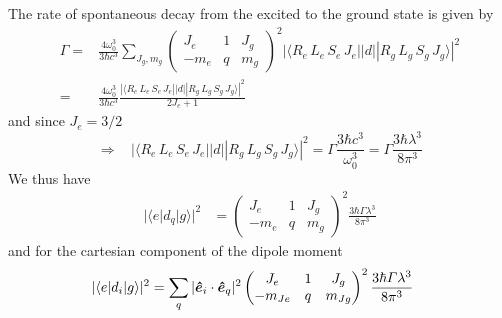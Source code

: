 The rate of spontaneous decay from the excited to the ground state is given by~\cite{budker2004atomic} 
\begin{equation}
\begin{split}
 \Gamma  = & \frac{4\omega_{0}^{3} }{3\hbar c^{3}} \sum_{J_{g}, m_{g} } 
 \begin{pmatrix} J_{e} & 1 & J_{g} \\ -m_{e} & q & m_{g} \end{pmatrix}^{2}
  |\langle R_{e}\, L_{e}\,S_{e}\,J_{e} || d || 
           R_{g}\, L_{g}\,S_{g}\,J_{g} \rangle|^{2}   \\
         = &  \frac{4\omega_{0}^{3} }{3\hbar c^{3}}  \frac{|\langle R_{e}\, L_{e}\,S_{e}\,J_{e} || d || 
           R_{g}\, L_{g}\,S_{g}\,J_{g} \rangle|^{2} }
       { 2J_{e} + 1 }
\end{split}
\end{equation}
and since $J_{e}=3/2$
\begin{equation}
\Rightarrow \ \ \ \ 
|\langle R_{e}\, L_{e}\,S_{e}\,J_{e} || d || R_{g}\, L_{g}\,S_{g}\,J_{g} \rangle|^{2} 
    =  \Gamma \frac{ 3\hbar c^{3}}{ \omega_{0}^{3} }  
    =  \Gamma \frac{ 3\hbar \lambda^{3}}{ 8 \pi^{3}}
\end{equation}
We thus have
\begin{align}
|\langle e | d_{q} | g \rangle|^{2} & = \begin{pmatrix} J_{e} & 1 & J_{g} \\ -m_{e} & q & m_{g} \end{pmatrix}^{2}
    \frac{ 3\hbar \Gamma \lambda^{3}}{ 8 \pi^{3}}
\end{align}
and for the cartesian component of the dipole moment
\begin{align}
|\langle e | d_{i} | g \rangle|^{2} & =  \sum_{q} |\bm{\hat{e}}_{i}\cdot \bm{\hat{e}}_{q}|^{2} \begin{pmatrix} J_{e} & 1 & J_{g} \\ -m_{Je} & q & m_{Jg} \end{pmatrix}^{2}
    \frac{ 3\hbar \Gamma \lambda^{3}}{ 8 \pi^{3}}
\end{align}

